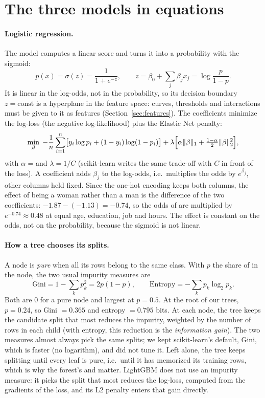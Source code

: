 \section{The three models in equations}
\label{sec:model-details}

\paragraph{Logistic regression.} The model computes a linear score and turns
it into a probability with the sigmoid:
\[
  p(x) = \sigma(z) = \frac{1}{1 + e^{-z}}, \qquad
  z = \beta_0 + \sum_j \beta_j x_j = \log\frac{p}{1-p}.
\]
It is linear in the log-odds, not in the probability, so its decision boundary
$z = \text{const}$ is a hyperplane in the feature space: curves, thresholds and
interactions must be given to it as features (Section~\ref{sec:features}). The
coefficients minimize the log-loss (the negative log-likelihood) plus the
Elastic Net penalty:
\[
  \min_\beta \; -\frac{1}{n}\sum_{i=1}^n \bigl[y_i \log p_i + (1-y_i)\log(1-p_i)\bigr]
  + \lambda \Bigl[\alpha \lVert\beta\rVert_1 + \tfrac{1-\alpha}{2}\lVert\beta\rVert_2^2\Bigr],
\]
with $\alpha$ =  and $\lambda = 1/C$ (scikit-learn writes the
same trade-off with $C$ in front of the loss). A coefficient adds $\beta_j$ to
the log-odds, i.e.\ multiplies the odds by $e^{\beta_j}$, other columns held
fixed. Since the one-hot encoding keeps both  columns, the effect of
being a woman rather than a man is the difference of the two coefficients:
$-1.87 - (-1.13) = -0.74$, so the odds of \pos{} are multiplied by
$e^{-0.74} \approx 0.48$ at equal age, education, job and hours. The effect is
constant on the odds, not on the probability, because the sigmoid is not
linear.

\paragraph{How a tree chooses its splits.} A node is \emph{pure} when all its
rows belong to the same class. With $p$ the share of \pos{} in the node, the
two usual impurity measures are
\[
  \text{Gini} = 1 - \sum_k p_k^2 = 2p(1-p),
  \qquad
  \text{Entropy} = -\sum_k p_k \log_2 p_k .
\]
Both are 0 for a pure node and largest at $p = 0.5$. At the root of our trees,
$p = 0.24$, so Gini $= 0.365$ and entropy $= 0.795$ bits. At each node, the tree
keeps the candidate split that most reduces the impurity, weighted by the
number of rows in each child (with entropy, this reduction is the
\emph{information gain}). The two measures almost always pick the same splits;
we kept scikit-learn's default, Gini, which is faster (no logarithm), and did
not tune it. Left alone, the tree keeps splitting until every leaf is pure,
i.e.\ until it has memorized its training rows, which is why the forest's
 and  matter. LightGBM does not use an
impurity measure: it picks the split that most reduces the log-loss, computed
from the gradients of the loss, and its L2 penalty  enters
that gain directly.

